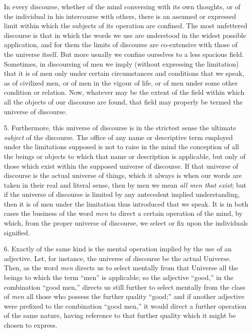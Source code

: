 \documentclass[oneside]{book}
\begin{document}
In every discourse, whether of the mind conversing with its
own thoughts, or of the individual in his intercourse with others,
there is an assumed or expressed limit within which the subjects of
its operation are confined. The most unfettered discourse is that
in which the words we use are understood in the widest possible
application, and for them the limits of discourse are co-extensive
with those of the universe itself. But more usually we confine ourselves
to a less spacious field. Sometimes, in discoursing of men
we imply (without expressing the limitation) that it is of men
only under certain circumstances and conditions that we speak,
as of civilized men, or of men in the vigour of life, or of men
under some other condition or relation. Now, whatever may be
the extent of the field within which all the objects of our discourse
are found, that field may properly be termed the universe
of discourse.

5. Furthermore, this universe of discourse is in the strictest
sense the ultimate \textit{subject} of the discourse. The office of any name
or descriptive term employed under the limitations supposed is not
to raise in the mind the conception of all the beings or objects to
which that name or description is applicable, but only of those
which exist within the supposed universe of discourse. If that
universe of discourse is the actual universe of things, which it
always is when our words are taken in their real and literal sense,
then by men we mean \textit{all men that exist}; but if the universe of
discourse is limited by any antecedent implied understanding,
then it is of men under the limitation thus introduced that we
speak. It is in both cases the business of the word \textit{men} to direct
a certain operation of the mind, by which, from the proper universe
of discourse, we select or fix upon the individuals signified.

6. Exactly of the same kind is the mental operation implied
by the use of an adjective. Let, for instance, the universe of discourse
be the actual Universe. Then, as the word \textit{men} directs
us to select mentally from that Universe all the beings to which
the term ``men'' is applicable; so the adjective ``good,'' in the
combination ``good men,'' directs us still further to select mentally
from the class of \textit{men} all those who possess the further
quality ``good;'' and if another adjective were prefixed to the
combination ``good men,'' it would direct a further operation of
the same nature, having reference to that further quality which
it might be chosen to express.
\end{document}
